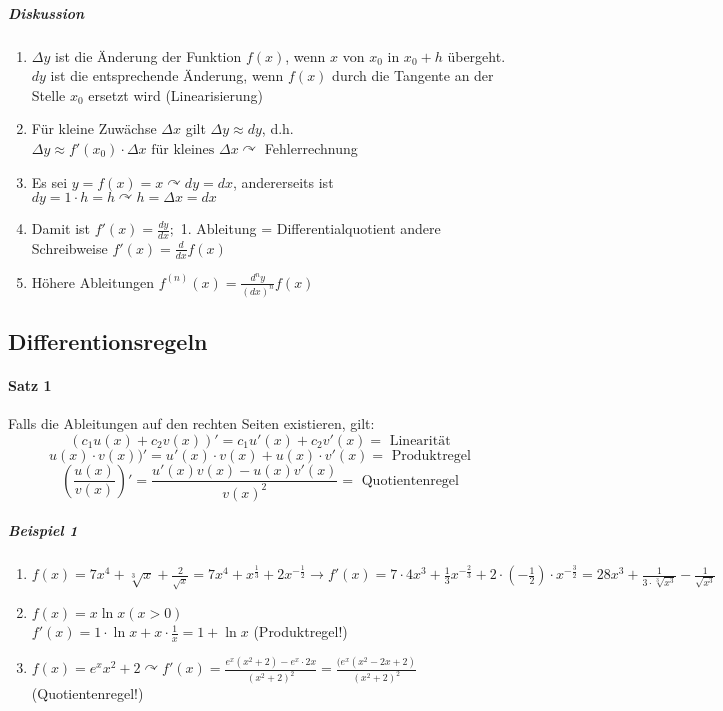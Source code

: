 \documentclass[a4paper]{scrartcl}
\begin{document}
\subparagraph{Diskussion}
\begin{enumerate}
\item $\Delta y$ ist die Änderung der Funktion $f(x)$, wenn $x$ von $x_0$ in $x_0+h$ übergeht. $dy$ ist die entsprechende Änderung, wenn $f(x)$ durch die Tangente an der Stelle $x_0$ ersetzt wird (Linearisierung)
\item Für kleine Zuwächse $\Delta x$ gilt $\Delta y \approx dy$, d.h. $\Delta y \approx f'(x_0) \cdot \Delta x \text{ für kleines } \Delta x \curvearrowright$ Fehlerrechnung
\item Es sei $y= f(x) = x \curvearrowright dy = dx$, andererseits ist $dy= 1 \cdot h = h \curvearrowright h = \Delta x = dx$
\item Damit ist $f'(x) = \frac{dy}{dx};$ 1. Ableitung = Differentialquotient andere Schreibweise $f'(x) = \frac{d}{dx} f(x)$
\item Höhere Ableitungen $f^{(n)} (x) = \frac{d^ny}{(dx)^n} f(x)$
\end{enumerate}

\subsection{Differentionsregeln}
\paragraph{Satz 1} Falls die Ableitungen auf den rechten Seiten existieren, gilt:
\[(c_1 u(x) + c_2 v(x))' = c_1 u'(x) + c_2 v'(x) = \text{ Linearität}\]
\[u(x) \cdot v(x))' = u'(x) \cdot v(x) + u(x) \cdot v'(x) = \text{ Produktregel}\]
\[(\frac{u(x)}{v(x)})' = \frac{u'(x) v(x) - u(x) v'(x)}{v(x)^2} = \text{ Quotientenregel}\]

\subparagraph{Beispiel 1}
\begin{enumerate}
\item $f(x) = 7x^4 + \sqrt[3]{x} + \frac{2}{\sqrt{x}} = 7x^4 + x^{\frac{1}{3}} + 2x^{-\frac{1}{2}} \rightarrow f'(x) = 7\cdot 4x^3 + \frac{1}{3} x^{-\frac{2}{3}} + 2 \cdot (-\frac{1}{2} ) \cdot x^{-\frac{3}{2}} = 28x^3 + \frac{1}{3 \cdot \sqrt[3]{x^3}} - \frac{1}{\sqrt{x^3}}$
\item $f(x) = x \ln{x} (x>0)$\\
$f'(x) = 1 \cdot \ln{x} + x \cdot \frac{1}{x} = 1 + \ln{x}$ (Produktregel!)
\item $f(x) = e^x x^2 + 2 \curvearrowright f'(x) = \frac{e^x (x^2+2) -e^x \cdot 2x}{(x^2 +2)^2} = \frac{(e^x (x^2 - 2x +2)}{(x^2 +2)^2}$ (Quotientenregel!)
\end{enumerate}
\end{document}
